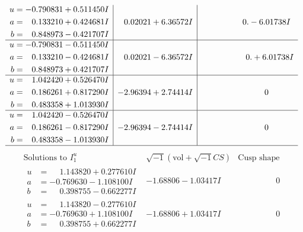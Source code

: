 \documentclass[1p]{elsarticle_modified}
\theoremstyle{definition}
\newcommand{\I}{\sqrt{-1}}
\begin{document}
$$\begin{array}{c|c|c}
\begin{aligned}
u &= -0.790831 + 0.511450 I \\
a &= \phantom{-}0.133210 + 0.424681 I \\
b &= \phantom{-}0.848973 - 0.421707 I\end{aligned}
 & \phantom{-}0.02021 + 6.36572 I & \phantom{-0.000000 } 0. - 6.01738 I \\ \hline\begin{aligned}
u &= -0.790831 - 0.511450 I \\
a &= \phantom{-}0.133210 - 0.424681 I \\
b &= \phantom{-}0.848973 + 0.421707 I\end{aligned}
 & \phantom{-}0.02021 - 6.36572 I & \phantom{-0.000000 -}0. + 6.01738 I \\ \hline\begin{aligned}
u &= \phantom{-}1.042420 + 0.526470 I \\
a &= \phantom{-}0.186261 + 0.817290 I \\
b &= \phantom{-}0.483358 + 1.013930 I\end{aligned}
 & -2.96394 + 2.74414 I & \phantom{-0.000000 } 0 \\ \hline\begin{aligned}
u &= \phantom{-}1.042420 - 0.526470 I \\
a &= \phantom{-}0.186261 - 0.817290 I \\
b &= \phantom{-}0.483358 - 1.013930 I\end{aligned}
 & -2.96394 - 2.74414 I & \phantom{-0.000000 } 0\\
 \hline 
 \end{array}$$\newpage$$\begin{array}{c|c|c}  
\text{Solutions to }I^u_{1}& \I (\text{vol} + \sqrt{-1}CS) & \text{Cusp shape}\\
 \hline 
\begin{aligned}
u &= \phantom{-}1.143820 + 0.277610 I \\
a &= -0.769630 - 1.108100 I \\
b &= \phantom{-}0.398755 - 0.662277 I\end{aligned}
 & -1.68806 - 1.03417 I & \phantom{-0.000000 } 0 \\ \hline\begin{aligned}
u &= \phantom{-}1.143820 - 0.277610 I \\
a &= -0.769630 + 1.108100 I \\
b &= \phantom{-}0.398755 + 0.662277 I\end{aligned}
 & -1.68806 + 1.03417 I & \phantom{-0.000000 } 0 \\ \hline\begin{aligned}

\end{aligned}
\end{array}$$
\end{document}
